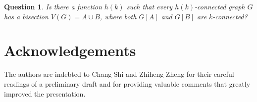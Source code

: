 \documentclass{aic}
\newtheorem{question}[dfn]{Question}
\begin{document}
	\begin{question}\label{que:connectivity}
		Is there a function $h(k)$ such that every $h(k)$-connected graph $G$ has a bisection $V(G)=A\cup B$, where both $G[A]$ and $G[B]$ are $k$-connected?
	\end{question}
	
	
	
	\section*{Acknowledgements}
	\noindent The authors are indebted to Chang Shi and Zhiheng Zheng for their careful readings of a preliminary draft and for providing valuable comments that greatly improved the presentation.
	
	
	
	
	
\end{document}
